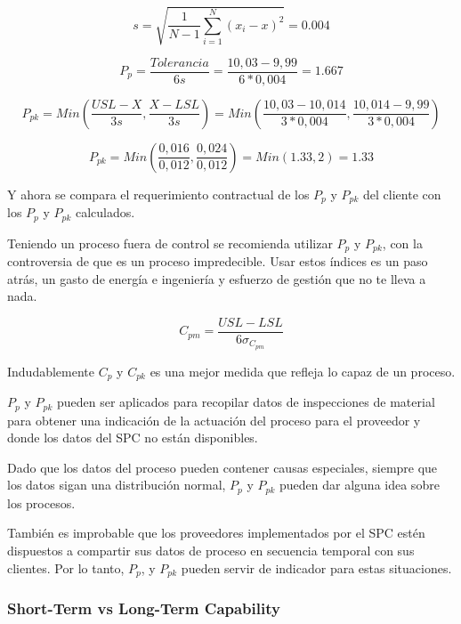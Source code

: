 \documentclass[]{article}
\begin{document}
\begin{equation}
s = \sqrt{\frac{1}{N-1}\sum_{i=1}^{N}(x_i-x)^2} = 0.004
\end{equation}

\begin{equation}
P_p = \frac{Tolerancia}{6s} = \frac{10,03 - 9,99}{6*0,004} = 1.667
\end{equation}

\begin{equation}
P_{pk}= Min(\frac{USL - X}{3s}, \frac{X - LSL}{3s}) = Min(\frac{10,03-10,014}{3*0,004},\frac{10,014-9,99}{3*0,004})
\end{equation}

\begin{equation}
P_{pk} = Min(\frac{0,016}{0,012},\frac{0,024}{0,012})= Min(1.33 , 2) = 1.33
\end{equation}

Y ahora se compara el requerimiento contractual de los $P_p$ y $P_{pk}$ del cliente con los $P_p$ y $P_{pk}$ calculados.

Teniendo un proceso fuera de control se recomienda utilizar $P_p$ y $P_{pk}$, con la controversia de que es un proceso impredecible. Usar estos índices es un paso atrás, un gasto de energía e ingeniería y esfuerzo de gestión que no te lleva a nada.

\begin{equation}
C_{pm} = \frac{USL - LSL}{6 \sigma_{C_{pm}}}
\end{equation}

Indudablemente $C_p$ y $C_{pk}$ es una mejor medida que refleja lo capaz de un proceso.

$P_p$ y $P_{pk}$ pueden ser aplicados para recopilar datos de inspecciones de material para obtener una indicación de la actuación del proceso para el proveedor y donde los datos del SPC no están disponibles.

Dado que los datos del proceso pueden contener causas especiales, siempre que los datos sigan una distribución normal, $P_p$ y $P_{pk}$ pueden dar alguna idea sobre los procesos.

También es improbable que los proveedores implementados por el SPC estén dispuestos a compartir sus datos de proceso en secuencia temporal con sus clientes. Por lo tanto, $P_p$,
y $P_{pk}$ pueden servir de indicador para estas situaciones.

\subsubsection{Short-Term vs Long-Term Capability}
\end{document}
